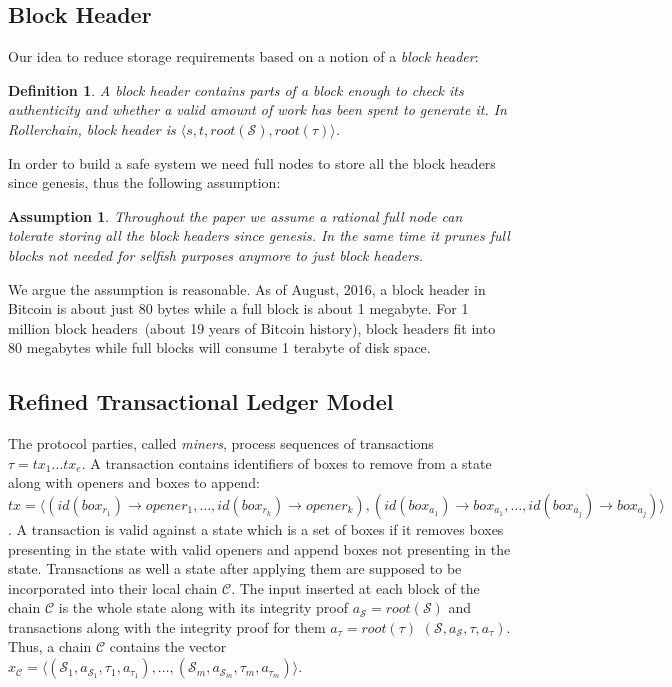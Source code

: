 \documentclass[conference,compsoc]{IEEEtran}
\newtheorem{definition}{Definition}
\newtheorem{assumption}{Assumption}
\begin{document}
\subsection{Block Header}

Our idea to reduce storage requirements based on a notion of a \textit{block header}: 

\begin{definition}
A block header contains parts of a block enough to check its authenticity and whether a valid amount of work has been spent to generate it. In Rollerchain, block header is $\langle s, t, root(\mathcal{S}), root(\tau)\rangle$.
\end{definition}

In order to build a safe system we need full nodes to store all the block headers since genesis, thus the following assumption: 

\begin{assumption}
Throughout the paper we assume a rational full node can tolerate storing all the block headers since genesis. In the same time it prunes full blocks not needed for selfish purposes anymore to just block headers.
\end{assumption}

We argue the assumption is reasonable. As of August, 2016, a block header in Bitcoin is about just 80 bytes while a full block is about 1 megabyte. For 1 million block headers~(about 19 years of Bitcoin history), block headers fit into 80 megabytes while full blocks will consume 1 terabyte of disk space. 

\subsection{Refined Transactional Ledger Model}

The protocol parties, called \textit{miners}, process sequences of transactions \(\tau = tx_1 \dots tx_e\). A transaction contains identifiers of boxes to remove from a state along with openers and boxes to append: \(tx = \langle (id(box_{r_1}) \rightarrow opener_1, \dots, id(box_{r_k}) \rightarrow opener_k), (id(box_{a_1}) \rightarrow box_{a_1} , \dots , id(box_{a_j}) \rightarrow box_{a_j}) \rangle \). A transaction is valid against a state which is a set of boxes if it removes boxes presenting in the state with valid openers and append boxes not presenting in the state. Transactions as well a state after applying them are supposed to be incorporated into their local chain \(\mathcal{C}\). The input inserted at each block of the chain \(\mathcal{C}\) is the whole state along with its integrity proof \(a_\mathcal{S} = root(\mathcal{S})\) and transactions along with the integrity proof for them \(a_{\tau} = root(\tau)\) \((\mathcal{S}, a_\mathcal{S}, \tau, a_{\tau})\). Thus, a chain \(\mathcal{C}\) contains the vector \(x_\mathcal{C} = \langle (\mathcal{S}_1, a_{\mathcal{S}_1}, \tau_1, a_{\tau_1}),\dots,(\mathcal{S}_m, a_{\mathcal{S}_m}, \tau_m, a_{\tau_m})\rangle\).
\end{document}
